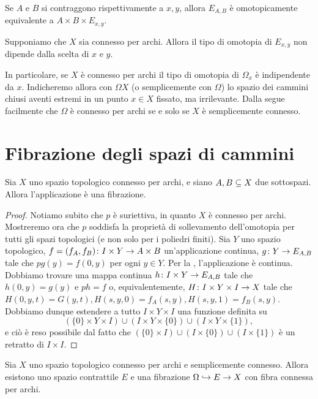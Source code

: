 \begin{corollary}
Se $A$ e $B$ si contraggono rispettivamente a $x,y$, allora $E_{A,B}$ è omotopicamente equivalente a $A\times B\times E_{x,y}$.
\end{corollary}
\begin{corollary}
Supponiamo che $X$ sia connesso per archi. Allora il tipo di omotopia di $E_{x,y}$ non dipende dalla scelta di $x$ e $y$.
\end{corollary}
In particolare, se $X$ è connesso per archi il tipo di omotopia di $\Omega_x$ è indipendente da $x$. Indicheremo allora con $\Omega X$ (o semplicemente con $\Omega$) lo spazio dei cammini chiusi aventi estremi in un punto $x\in X$ fissato, ma irrilevante. Dalla  segue facilmente che $\Omega$ è connesso per archi se e solo se $X$ è semplicemente connesso.

\section{Fibrazione degli spazi di cammini}
\begin{proposition}
Sia $X$ uno spazio topologico connesso per archi, e siano $A,B\subseteq X$ due sottospazi. Allora l'applicazione
è una fibrazione.
\end{proposition}
\begin{proof}
Notiamo subito che $p$ è suriettiva, in quanto $X$ è connesso per archi. Mostreremo ora che $p$ soddisfa la proprietà di sollevamento dell'omotopia per tutti gli spazi topologici (e non solo per i poliedri finiti). Sia $Y$ uno spazio topologico, $f=(f_A,f_B)\colon I\times Y\to A\times B$ un'applicazione continua, $g\colon Y\to E_{A,B}$ tale che $pg(y)=f(0,y)$ per ogni $y\in Y$. Per la , l'applicazione
è continua. Dobbiamo trovare una mappa continua $h\colon I\times Y\to E_{A,B}$ tale che $h(0,y)=g(y)$ e $ph=f$ o, equivalentemente, $H\colon I\times Y\times I\to X$ tale che $H(0,y,t)=G(y,t),H(s,y,0)=f_A(s,y),H(s,y,1)=f_B(s,y)$. Dobbiamo dunque estendere a tutto $I\times Y\times I$ una funzione definita su
$$
(\{0\}\times Y\times I)\cup(I\times Y\times \{0\})\cup(I\times Y\times \{1\}),
$$
e ciò è reso possibile dal fatto che $(\{0\}\times I)\cup(I\times\{0\})\cup(I\times\{1\})$ è un retratto di $I\times I$.
\end{proof}

\begin{corollary}
Sia $X$ uno spazio topologico connesso per archi e semplicemente connesso. Allora esistono uno spazio contrattile $E$ e una fibrazione $\Omega\hookrightarrow E\to X$ con fibra connessa per archi.
\end{corollary}

